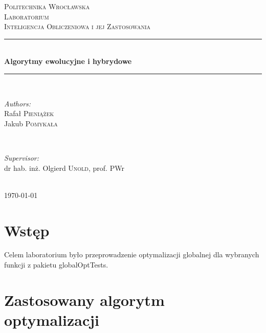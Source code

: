 \documentclass{article}
\begin{document}
	
	\begin{titlepage}
		\center
		\newcommand{\HRule}{\rule{\linewidth}{0.6mm}}
		
		\textsc{\LARGE Politechnika Wrocławska}\\[1.5cm]
		\textsc{\Large Laboratorium}\\[0.5cm] 
		\textsc{\large Inteligencja Obliczeniowa i jej Zastosowania}\\[0.7cm] 

		\HRule \\[0.4cm]
		{ \huge \bfseries Algorytmy ewolucyjne i hybrydowe}\\[0.4cm]
		\HRule \\[1.5cm]
		
		\begin{minipage}{0.4\textwidth}
			\begin{flushleft} \large
				\emph{Authors:}\\
				Rafał \textsc{Pieniążek}\\
                Jakub \textsc{Pomykała}
			\end{flushleft}
		\end{minipage}
		~
		\begin{minipage}{0.4\textwidth}
			\begin{flushright} \large
				\emph{Supervisor:} \\
				dr hab. inż. Olgierd \textsc{Unold}, prof. PWr
			\end{flushright}
		\end{minipage}\\[4cm]

		{\large \today}\\[3cm]
		
		\vfill
		
	\end{titlepage}
\tableofcontents
\newpage
\listoffigures
\newpage
\section{Wstęp}
	Celem laboratorium było przeprowadzenie optymalizacji globalnej dla wybranych funkcji z pakietu globalOptTests.
    

\section{Zastosowany algorytm optymalizacji}
\end{document}
